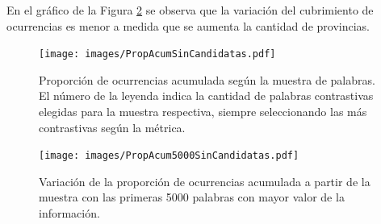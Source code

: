 En el gráfico de la Figura \ref{fig:propAcum5000} se observa que la variación del cubrimiento de ocurrencias es menor a medida que se aumenta la cantidad de provincias. 


\begin{figure}\centering
    \texttt{[image: images/PropAcumSinCandidatas.pdf]}
    \caption{Proporción de ocurrencias acumulada según la muestra de palabras. El número de la leyenda indica la cantidad de palabras contrastivas elegidas para la muestra respectiva, siempre seleccionando las más contrastivas según la métrica.} 
    \label{fig:propAcum} 
\end{figure}


\begin{figure}[ht]\centering
    \texttt{[image: images/PropAcum5000SinCandidatas.pdf]}
    \caption{Variación de la proporción de ocurrencias acumulada a partir de la muestra con las primeras 5000 palabras con mayor valor de la información.} 
    \label{fig:propAcum5000} 
\end{figure}

